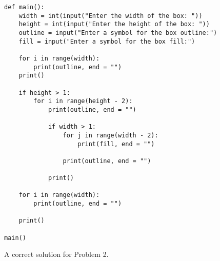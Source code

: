 \begin{figure}[ht]
\begin{lstlisting}[numbers=none]
def main():
    width = int(input("Enter the width of the box: "))
    height = int(input("Enter the height of the box: "))
    outline = input("Enter a symbol for the box outline:")
    fill = input("Enter a symbol for the box fill:")

    for i in range(width):
        print(outline, end = "")
    print()
    
    if height > 1:
        for i in range(height - 2):
            print(outline, end = "")
            
            if width > 1:
                for j in range(width - 2):
                    print(fill, end = "")
                    
                print(outline, end = "")
            
            print()

    for i in range(width):
        print(outline, end = "")
    
    print()

main()
  \end{lstlisting}
  \caption{A correct solution for Problem 2.}
  \label{fig:correctp2}
\end{figure}